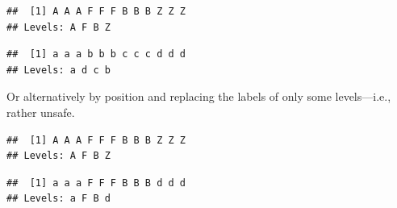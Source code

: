 \documentclass[krantz2]{krantz}\usepackage{knitr}
\begin{document}
\begin{explainbox}
\begin{knitrout}\footnotesize
{}\color{fgcolor}\begin{kframe}
\begin{alltt}
 \hlkwb{<-} \hlstd{(}\hlstd{,} \hlstd{,}  \hlstd{=} \hlstd{(}\hlstd{,} \hlstd{,} \hlstd{,} \hlstd{))}
\end{alltt}
\begin{verbatim}
##  [1] A A A F F F B B B Z Z Z
## Levels: A F B Z
\end{verbatim}
\begin{alltt}
 \hlkwb{<-} \hlstd{(} \hlstd{=} \hlstd{,}  \hlstd{=} \hlstd{,}  \hlstd{=} \hlstd{,}  \hlstd{=} \hlstd{)}
\end{alltt}
\begin{verbatim}
##  [1] a a a b b b c c c d d d
## Levels: a d c b
\end{verbatim}
\end{kframe}
\end{knitrout}

Or alternatively by position and replacing the labels of only some levels---i.e., rather unsafe.

\begin{knitrout}\footnotesize
{}\color{fgcolor}\begin{kframe}
\begin{alltt}
 \hlkwb{<-} \hlstd{(}\hlstd{,} \hlstd{,}  \hlstd{=} \hlstd{(}\hlstd{,} \hlstd{,} \hlstd{,} \hlstd{))}
\end{alltt}
\begin{verbatim}
##  [1] A A A F F F B B B Z Z Z
## Levels: A F B Z
\end{verbatim}
\end{kframe}
\end{knitrout}

\begin{knitrout}\footnotesize
{}\color{fgcolor}\begin{kframe}
\begin{alltt}
\hlstd{(my.factor1)[}\hlstd{(}\hlstd{,} \hlstd{)]} \hlkwb{<-} \hlstd{(}\hlstd{,} \hlstd{)}
\end{alltt}
\begin{verbatim}
##  [1] a a a F F F B B B d d d
## Levels: a F B d
\end{verbatim}
\end{kframe}
\end{knitrout}

\end{explainbox}
\end{document}
